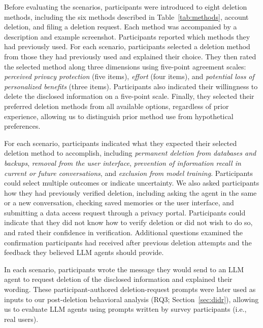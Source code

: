 %
Before evaluating the scenarios, participants were introduced to eight deletion methods, including the six methods described in Table~\ref{tab:methods}, account deletion, and filing a deletion request.
%
Each method was accompanied by a description and example screenshot. 
%
Participants reported which methods they had previously used.
%
For each scenario, participants selected a deletion method from those they had previously used and explained their choice. 
%
They then rated the selected method along three dimensions using five-point agreement scales: \textit{perceived privacy protection} (five items), \textit{effort} (four items), and \textit{potential loss of personalized benefits} (three items). 
%
Participants also indicated their willingness to delete the disclosed information on a five-point scale. 
%
Finally, they selected their preferred deletion methods from all available options, regardless of prior experience, allowing us to distinguish prior method use from hypothetical preferences.

%
For each scenario, participants indicated what they expected their selected deletion method to accomplish, including \textit{permanent deletion from databases and backups}, \textit{removal from the user interface}, \textit{prevention of information recall in current or future conversations}, and \textit{exclusion from model training}. 
%
Participants could select multiple outcomes or indicate uncertainty.
%
We also asked participants how they had previously verified deletion, including asking the agent in the same or a new conversation, checking saved memories or the user interface, and submitting a data access request through a privacy portal. 
%
Participants could indicate that they did not know how to verify deletion or did not wish to do so, and rated their confidence in verification. 
%
Additional questions examined the confirmation participants had received after previous deletion attempts and the feedback they believed LLM agents should provide.

%
In each scenario, participants wrote the message they would send to an LLM agent to request deletion of the disclosed information and explained their wording. 
%
These participant-authored deletion-request prompts were later used as inputs to our post-deletion behavioral analysis (RQ3; Section~\ref{sec:didr}), allowing us to evaluate LLM agents using prompts written by survey participants (i.e., real users).

